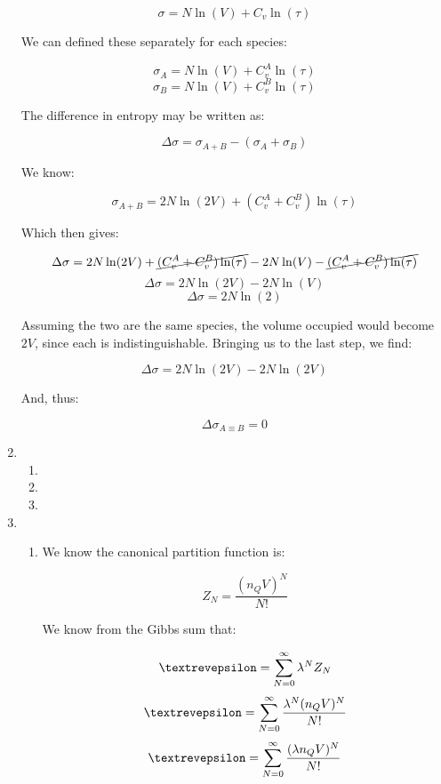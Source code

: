 \begin{enumerate}
    $$\sigma=N\ln(V)+C_v\ln(\tau)$$

    We can defined these separately for each species:

    $$\sigma_A=N\ln(V)+C^A_v\ln(\tau)$$
    $$\sigma_B=N\ln(V)+C^B_v\ln(\tau)$$

    The difference in entropy may be written as:

    $$\Delta\sigma=\sigma_{A+B}-(\sigma_A+\sigma_B)$$

    We know:

    $$\sigma_{A+B}=2N\ln(2V)+(C^A_v+C^B_v)\ln(\tau)$$

    Which then gives:

    $$\Delta\sigma=2N\ln(2V)+\cancel{(C^A_v+C^B_v)\ln(\tau)}-2N\ln(V)-\cancel{(C^A_v+C^B_v)\ln(\tau)}$$
    $$\Delta\sigma=2N\ln(2V)-2N\ln(V)$$
    $$\boxed{\Delta\sigma=2N\ln(2)}$$

    Assuming the two are the same species, the volume occupied would become $2V$, since each is indistinguishable. Bringing us to the last step, we find:

    $$\Delta\sigma=2N\ln(2V)-2N\ln(2V)$$

    And, thus:

    $$\boxed{\Delta\sigma_{A\equiv B}=0}$$

    \setcounter{enumi}{11}

  \item

    \begin{enumerate}

      \item 

      \item 

      \item 

    \end{enumerate}

  \item

    \begin{enumerate}

      \item 

        We know the canonical partition function is:

        $$Z_N=\frac{(n_QV)^N}{N!}$$

        We know from the Gibbs sum that:

        $$\text{\textrevepsilon}=\sum_{N=0}^\infty \lambda^NZ_N$$
        $$\text{\textrevepsilon}=\sum_{N=0}^\infty \frac{\lambda^N(n_QV)^N}{N!}$$
        $$\text{\textrevepsilon}=\sum_{N=0}^\infty \frac{(\lambda n_QV)^N}{N!}$$


\end{enumerate}
\end{enumerate}

